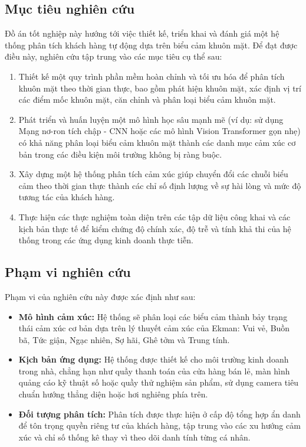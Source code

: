 \subsection{Mục tiêu nghiên cứu}
Đồ án tốt nghiệp này hướng tới việc thiết kế, triển khai và đánh giá một hệ thống phân tích khách hàng tự động dựa trên biểu cảm khuôn mặt. Để đạt được điều này, nghiên cứu tập trung vào các mục tiêu cụ thể sau:
\begin{enumerate}
    \item Thiết kế một quy trình phần mềm hoàn chỉnh và tối ưu hóa để phân tích khuôn mặt theo thời gian thực, bao gồm phát hiện khuôn mặt, xác định vị trí các điểm mốc khuôn mặt, căn chỉnh và phân loại biểu cảm khuôn mặt.
    \item Phát triển và huấn luyện một mô hình học sâu mạnh mẽ (ví dụ: sử dụng Mạng nơ-ron tích chập - CNN hoặc các mô hình Vision Transformer gọn nhẹ) có khả năng phân loại biểu cảm khuôn mặt thành các danh mục cảm xúc cơ bản trong các điều kiện môi trường không bị ràng buộc.
    \item Xây dựng một hệ thống phân tích cảm xúc giúp chuyển đổi các chuỗi biểu cảm theo thời gian thực thành các chỉ số định lượng về sự hài lòng và mức độ tương tác của khách hàng.
    \item Thực hiện các thực nghiệm toàn diện trên các tập dữ liệu công khai và các kịch bản thực tế để kiểm chứng độ chính xác, độ trễ và tính khả thi của hệ thống trong các ứng dụng kinh doanh thực tiễn.
\end{enumerate}

\subsection{Phạm vi nghiên cứu}
Phạm vi của nghiên cứu này được xác định như sau:
\begin{itemize}
    \item \textbf{Mô hình cảm xúc:} Hệ thống sẽ phân loại các biểu cảm thành bảy trạng thái cảm xúc cơ bản dựa trên lý thuyết cảm xúc của Ekman: Vui vẻ, Buồn bã, Tức giận, Ngạc nhiên, Sợ hãi, Ghê tởm và Trung tính.
    \item \textbf{Kịch bản ứng dụng:} Hệ thống được thiết kế cho môi trường kinh doanh trong nhà, chẳng hạn như quầy thanh toán của cửa hàng bán lẻ, màn hình quảng cáo kỹ thuật số hoặc quầy thử nghiệm sản phẩm, sử dụng camera tiêu chuẩn hướng thẳng diện hoặc hơi nghiêng phía trên.
    \item \textbf{Đối tượng phân tích:} Phân tích được thực hiện ở cấp độ tổng hợp ẩn danh để tôn trọng quyền riêng tư của khách hàng, tập trung vào các xu hướng cảm xúc và chỉ số thống kê thay vì theo dõi danh tính từng cá nhân.
\end{itemize}

